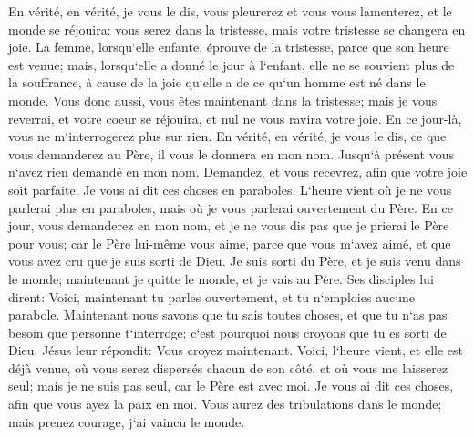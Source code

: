 \verse En vérité, en vérité, je vous le dis, vous pleurerez et vous vous lamenterez, et le monde se réjouira: vous serez dans la tristesse, mais votre tristesse se changera en joie. 
\verse La femme, lorsqu`elle enfante, éprouve de la tristesse, parce que son heure est venue; mais, lorsqu`elle a donné le jour à l`enfant, elle ne se souvient plus de la souffrance, à cause de la joie qu`elle a de ce qu`un homme est né dans le monde. 
\verse Vous donc aussi, vous êtes maintenant dans la tristesse; mais je vous reverrai, et votre coeur se réjouira, et nul ne vous ravira votre joie. 
\verse En ce jour-là, vous ne m`interrogerez plus sur rien. En vérité, en vérité, je vous le dis, ce que vous demanderez au Père, il vous le donnera en mon nom. 
\verse Jusqu`à présent vous n`avez rien demandé en mon nom. Demandez, et vous recevrez, afin que votre joie soit parfaite. 
\verse Je vous ai dit ces choses en paraboles. L`heure vient où je ne vous parlerai plus en paraboles, mais où je vous parlerai ouvertement du Père. 
\verse En ce jour, vous demanderez en mon nom, et je ne vous dis pas que je prierai le Père pour vous; 
\verse car le Père lui-même vous aime, parce que vous m`avez aimé, et que vous avez cru que je suis sorti de Dieu. 
\verse Je suis sorti du Père, et je suis venu dans le monde; maintenant je quitte le monde, et je vais au Père. 
\verse Ses disciples lui dirent: Voici, maintenant tu parles ouvertement, et tu n`emploies aucune parabole. 
\verse Maintenant nous savons que tu sais toutes choses, et que tu n`as pas besoin que personne t`interroge; c`est pourquoi nous croyons que tu es sorti de Dieu. 
\verse Jésus leur répondit: Vous croyez maintenant. 
\verse Voici, l`heure vient, et elle est déjà venue, où vous serez dispersés chacun de son côté, et où vous me laisserez seul; mais je ne suis pas seul, car le Père est avec moi. 
\verse Je vous ai dit ces choses, afin que vous ayez la paix en moi. Vous aurez des tribulations dans le monde; mais prenez courage, j`ai vaincu le monde. 

